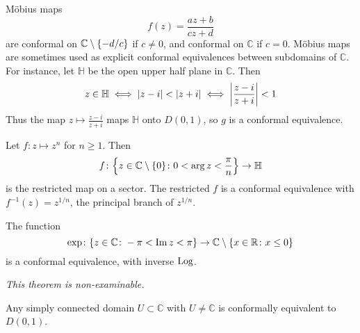 \begin{example}
	M\"obius maps
	\[ f(z) = \frac{az+b}{cz+d} \]
	are conformal on \( \mathbb C \setminus \qty{-d/c} \) if \( c \neq 0 \), and conformal on \( \mathbb C \) if \( c = 0 \).
	M\"obius maps are sometimes used as explicit conformal equivalences between subdomains of \( \mathbb C \).
	For instance, let \( \mathbb H \) be the open upper half plane in \( \mathbb C \).
	Then
	\[ z \in \mathbb H \iff \abs{z - i} < \abs{z + i} \iff \abs{\frac{z - i}{z + i}} < 1 \]
	Thus the map \( z \mapsto \frac{z-i}{z+i} \) maps \( \mathbb H \) onto \( D(0,1) \), so \( g \) is a conformal equivalence.
\end{example}
\begin{example}
	Let \( f \colon z \mapsto z^n \) for \( n \geq 1 \).
	Then
	\[ f \colon \qty{z \in \mathbb C \setminus \qty{0} \colon 0 < \arg z < \frac{\pi}{n}} \to \mathbb H \]
	is the restricted map on a sector.
	The restricted \( f \) is a conformal equivalence with \( f^{-1}(z) = z^{1/n} \), the principal branch of \( z^{1/n} \).
\end{example}
\begin{example}
	The function
	\[ \exp \colon \qty{z \in \mathbb C \colon -\pi < \Im z < \pi} \to \mathbb C \setminus \qty{x \in \mathbb R \colon x \leq 0} \]
	is a conformal equivalence, with inverse \( \operatorname{Log} \).
\end{example}
\begin{theorem}
	\textit{This theorem is non-examinable.}

	Any simply connected domain \( U \subset \mathbb C \) with \( U \neq \mathbb C \) is conformally equivalent to \( D(0,1) \).
\end{theorem}
